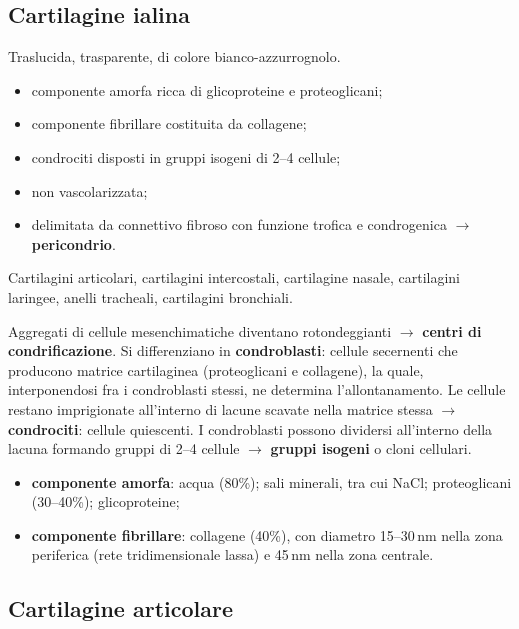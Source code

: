 \subsection{Cartilagine ialina}

Traslucida, trasparente, di colore bianco-azzurrognolo.
\begin{itemize}
  \item componente amorfa ricca di glicoproteine e proteoglicani;
  \item componente fibrillare costituita da collagene;
  \item condrociti disposti in gruppi isogeni di 2--4 cellule;
  \item non vascolarizzata;
  \item delimitata da connettivo fibroso con funzione trofica e condrogenica $\rightarrow$ \textbf{pericondrio}.
\end{itemize}

Cartilagini articolari, cartilagini intercostali, cartilagine nasale, cartilagini laringee, anelli tracheali, cartilagini bronchiali.

Aggregati di cellule mesenchimatiche diventano rotondeggianti $\rightarrow$ \textbf{centri di condrificazione}. Si differenziano in \textbf{condroblasti}: cellule secernenti che producono matrice cartilaginea (proteoglicani e collagene), la quale, interponendosi fra i condroblasti stessi, ne determina l'allontanamento. Le cellule restano imprigionate all'interno di lacune scavate nella matrice stessa $\rightarrow$ \textbf{condrociti}: cellule quiescenti. I condroblasti possono dividersi all'interno della lacuna formando gruppi di 2--4 cellule $\rightarrow$ \textbf{gruppi isogeni} o cloni cellulari.

\begin{itemize}
  \item \textbf{componente amorfa}: acqua (80\%); sali minerali, tra cui NaCl; proteoglicani (30--40\%); glicoproteine;
  \item \textbf{componente fibrillare}: collagene (40\%), con diametro 15--30\,nm nella zona periferica (rete tridimensionale lassa) e 45\,nm nella zona centrale.
\end{itemize}

\subsection{Cartilagine articolare}

